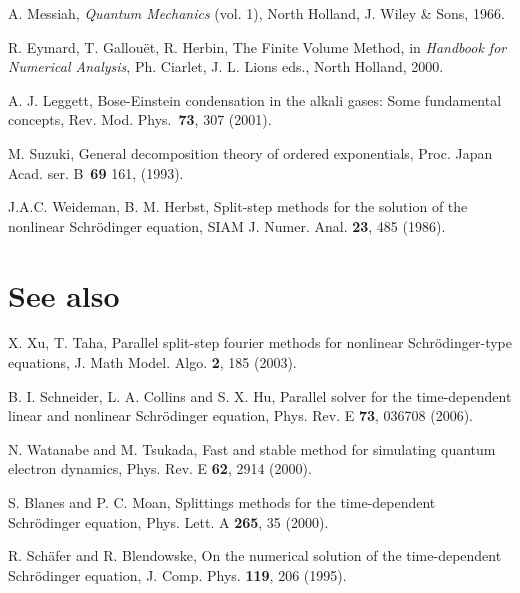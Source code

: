 \documentclass[a4paper,11pt]{article}
\begin{document}
\begin{thebibliography}{5}

A. Messiah, \emph{Quantum Mechanics} (vol. 1), North Holland, J. Wiley \& Sons, 1966.

R. Eymard, T. Gallou\"et, R. Herbin, The Finite Volume Method, in \emph{Handbook for Numerical Analysis},
Ph. Ciarlet, J. L. Lions eds., North Holland, 2000.

A. J. Leggett, Bose-Einstein condensation in the alkali gases: Some fundamental concepts,
Rev. Mod. Phys.~\textbf{73}, 307 (2001).

M. Suzuki, General decomposition theory of ordered exponentials,
Proc. Japan Acad. ser. B~\textbf{69} 161, (1993).


J.A.C. Weideman, B. M. Herbst, Split-step methods for the solution of the nonlinear
Schr\"odinger equation, SIAM J. Numer. Anal. \textbf{23}, 485 (1986).


\end{thebibliography}

\section*{See also}

\begin{trivlist}
\item
X. Xu, T. Taha, Parallel split-step fourier methods for nonlinear Schr\"odinger-type equations,
J. Math Model. Algo. \textbf{2}, 185 (2003).
\item
B. I. Schneider, L. A. Collins and S. X. Hu,
Parallel solver for the time-dependent linear and nonlinear Schr\"odinger equation,
Phys. Rev. E \textbf{73}, 036708 (2006).
\item
N. Watanabe and M. Tsukada,
Fast and stable method for simulating quantum electron dynamics,
Phys. Rev. E \textbf{62}, 2914 (2000).
\item
S. Blanes and P. C. Moan,
Splittings methods for the time-dependent Schr\"odinger equation,
Phys. Lett. A \textbf{265}, 35 (2000).
\item
R. Sch\"afer and R. Blendowske,
On the numerical solution of the time-dependent
Schr\"odinger equation,
J. Comp. Phys. \textbf{119}, 206 (1995).
\end{trivlist}
\end{document}
